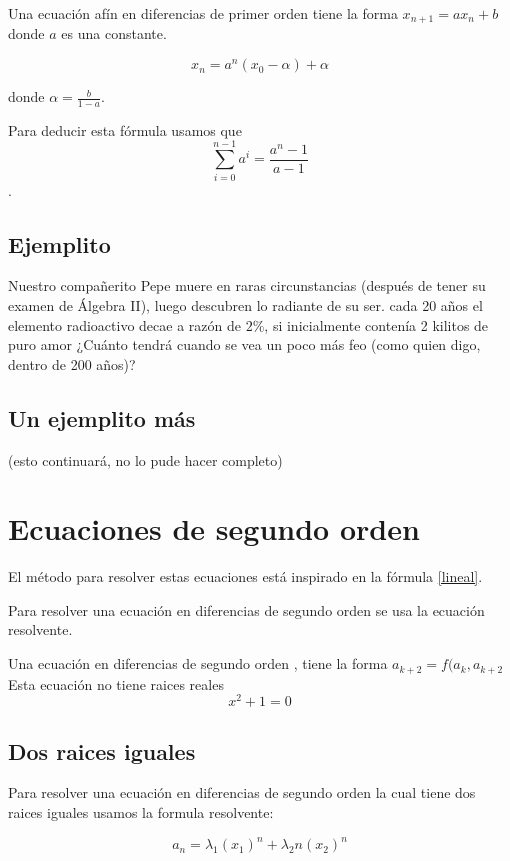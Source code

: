 \documentclass{article}
\begin{document}
Una ecuación afín en diferencias de primer orden tiene la forma $x_{n+1}=ax_n+b$ donde $a$ es una constante. 

\begin{equation}
  \label{afin}
  x_n=a^n(x_0-\alpha)+\alpha
\end{equation}

donde $\alpha=\frac{b}{1-a}$. 

Para deducir esta fórmula usamos que $$\sum_{i=0}^{n-1}a^i=\frac{a^n-1}{a-1}$$.

\subsection{Ejemplito}

Nuestro compañerito Pepe muere en raras circunstancias (después de tener su examen de Álgebra II), luego descubren lo radiante de su ser. cada 20 años el elemento radioactivo decae a razón de $2\%$, si inicialmente contenía 2 kilitos de puro amor ¿Cuánto tendrá cuando se vea un poco más feo (como quien digo, dentro de 200 años)?

\subsection{Un ejemplito más}

(esto continuará, no lo pude hacer completo)

\section{Ecuaciones de segundo orden}

El método para resolver estas ecuaciones está inspirado en la fórmula \ref{lineal}.

Para resolver una ecuación en diferencias de segundo orden se usa la ecuación resolvente.

Una ecuación en diferencias de segundo orden , tiene la forma $a_{k+2}=f(a_k ,a_{k+2}$
Esta ecuaci\'on no tiene raices reales $$x^2+1=0$$


\subsection{Dos raices iguales}
Para resolver una ecuación en diferencias de segundo orden la cual tiene dos raices iguales usamos la formula resolvente:

\begin{equation}
 \label{raicesiguales}
 a_n=\lambda_1(x_1)^n +\lambda_2n(x_2)^n
\end{equation}
\end{document}
